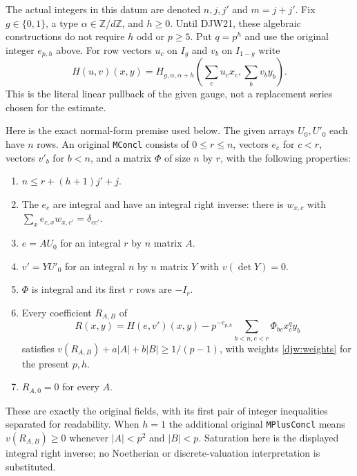 The actual integers in this datum are denoted $n,j,j'$ and
$m=j+j'$.  Fix $g\in\{0,1\}$, a type $\alpha\in\mathbb Z/d\mathbb Z$,
and $h\ge0$.  Until DJW21, these algebraic constructions do not
require $h$ odd or $p\ge5$.
Put $q=p^h$ and use the original integer $e_{p,h}$ above.
For row vectors $u_c$ on $I_g$ and $v_b$ on $I_{1-g}$ write
\[
 H(u,v)(x,y)=H_{g,\alpha,\alpha+h}
       \left(\sum_cu_c x_c,\sum_bv_b y_b\right).
\]
This is the literal linear pullback of the given gauge, not a
replacement series chosen for the estimate.

Here is the exact normal-form premise used below.  The given arrays
$U_0,U'_0$ each have $n$ rows.  An original
\texttt{MConcl} consists of $0\le r\le n$, vectors $e_c$ for
$c<r$, vectors $v'_b$ for $b<n$, and a matrix $\Phi$ of size
$n$ by $r$, with the following properties:
\begin{enumerate}
\item $n\le r+(h+1)j'+j$.
\item The $e_c$ are integral and have an integral right inverse:
there is $w_{x,c}$ with
$\sum_x e_{c,x}w_{x,c'}=\delta_{cc'}$.
\item $e=A U_0$ for an integral $r$ by $n$ matrix $A$.
\item $v'=Y U'_0$ for an integral $n$ by $n$ matrix $Y$ with
$v(\det Y)=0$.
\item $\Phi$ is integral and its first $r$ rows are $-I_r$.
\item Every coefficient $R_{A,B}$ of
\begin{equation}
 R(x,y)=H(e,v')(x,y)
        -p^{-e_{p,h}}\sum_{b<n,c<r}\Phi_{bc}x_c^q y_b
 \label{djw:actualremainder}
\end{equation}
satisfies
$v(R_{A,B})+a|A|+b|B|\ge1/(p-1)$, with weights
\eqref{djw:weights} for the present $p,h$.
\item $R_{A,0}=0$ for every $A$.
\end{enumerate}
These are exactly the original fields, with its first pair of
integer inequalities separated for readability.  When $h=1$ the
additional original \texttt{MPlusConcl} means
$v(R_{A,B})\ge0$ whenever $|A|<p^2$ and $|B|<p$.
Saturation here is the displayed integral right inverse; no
Noetherian or discrete-valuation interpretation is substituted.

